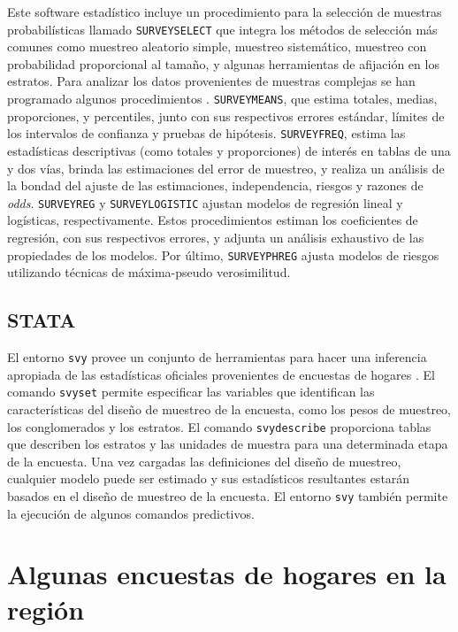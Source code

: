 \documentclass[12pt,spanish,]{book}
\begin{document}
Este software estadístico incluye un procedimiento para la selección de muestras probabilísticas llamado \texttt{SURVEYSELECT} que integra los métodos de selección más comunes como muestreo aleatorio simple, muestreo sistemático, muestreo con probabilidad proporcional al tamaño, y algunas herramientas de afijación en los estratos. Para analizar los datos provenientes de muestras complejas se han programado algunos procedimientos \autocite{SAS_2017}. \texttt{SURVEYMEANS}, que estima totales, medias, proporciones, y percentiles, junto con sus respectivos errores estándar, límites de los intervalos de confianza y pruebas de hipótesis. \texttt{SURVEYFREQ}, estima las estadísticas descriptivas (como totales y proporciones) de interés en tablas de una y dos vías, brinda las estimaciones del error de muestreo, y realiza un análisis de la bondad del ajuste de las estimaciones, independencia, riesgos y razones de \emph{odds}. \texttt{SURVEYREG} y \texttt{SURVEYLOGISTIC} ajustan modelos de regresión lineal y logísticas, respectivamente. Estos procedimientos estiman los coeficientes de regresión, con sus respectivos errores, y adjunta un análisis exhaustivo de las propiedades de los modelos. Por último, \texttt{SURVEYPHREG} ajusta modelos de riesgos utilizando técnicas de máxima-pseudo verosimilitud.

\hypertarget{stata}{%
\subsection*{STATA}\label{stata}}

El entorno \texttt{svy} provee un conjunto de herramientas para hacer una inferencia apropiada de las estadísticas oficiales provenientes de encuestas de hogares \autocite{STATA_2017}. El comando \texttt{svyset} permite especificar las variables que identifican las características del diseño de muestreo de la encuesta, como los pesos de muestreo, los conglomerados y los estratos. El comando \texttt{svydescribe} proporciona tablas que describen los estratos y las unidades de muestra para una determinada etapa de la encuesta. Una vez cargadas las definiciones del diseño de muestreo, cualquier modelo puede ser estimado y sus estadísticos resultantes estarán basados en el diseño de muestreo de la encuesta. El entorno \texttt{svy} también permite la ejecución de algunos comandos predictivos.

\hypertarget{algunas-encuestas-de-hogares-en-la-region}{%
\section*{Algunas encuestas de hogares en la región}\label{algunas-encuestas-de-hogares-en-la-region}}
\end{document}

